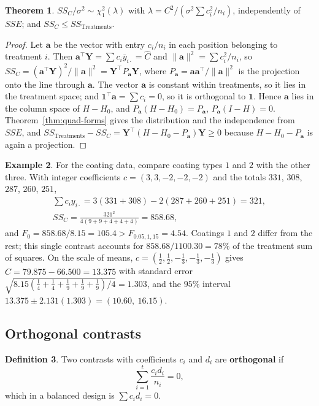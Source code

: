 \documentclass[11pt,a4paper]{article}
\numberwithin{equation}{section}
\theoremstyle{definition}
\newtheorem{thm}{Theorem}[subsection]
\newtheorem{defn}[thm]{Definition}
\newtheorem{exa}[thm]{Example}
\begin{document}
\begin{thm}\label{thm:contrast-ss}
$SS_C/\sigma^2 \sim \chi^2_1(\lambda)$ with $\lambda = C^2/(\sigma^2\sum c_i^2/n_i)$, independently of $SSE$; and $SS_C \le SS_{\mathrm{Treatments}}$.
\end{thm}

\begin{proof}
Let $\mathbf a$ be the vector with entry $c_i/n_i$ in each position belonging to treatment $i$. Then $\mathbf a^\top\mathbf Y = \sum c_i\bar y_{i\cdot} = \hat C$ and $\|\mathbf a\|^2 = \sum c_i^2/n_i$, so
$SS_C = (\mathbf a^\top\mathbf Y)^2/\|\mathbf a\|^2 = \mathbf Y^\top P_{\mathbf a}\mathbf Y$, where $P_{\mathbf a} = \mathbf a\mathbf a^\top/\|\mathbf a\|^2$ is the projection onto the line through $\mathbf a$. The vector $\mathbf a$ is constant
within treatments, so it lies in the treatment space; and $\mathbf 1^\top\mathbf a = \sum c_i = 0$, so it is orthogonal to $\mathbf 1$. Hence $\mathbf a$ lies in the column space of
$H - H_0$, and $P_{\mathbf a}(H - H_0) = P_{\mathbf a}$, $P_{\mathbf a}(I - H) = 0$. Theorem~\ref{thm:quad-forms} gives the distribution and the independence from $SSE$, and
$SS_{\mathrm{Treatments}} - SS_C = \mathbf Y^\top(H - H_0 - P_{\mathbf a})\mathbf Y \ge 0$ because $H - H_0 - P_{\mathbf a}$ is again a projection.
\end{proof}

\begin{exa}\label{exa:coating-contrast}
For the coating data, compare coating types $1$ and $2$ with the other three. With integer coefficients $c = (3, 3, -2, -2, -2)$ and the totals
$331$, $308$, $287$, $260$, $251$,
\begin{gather*}
\sum c_iy_{i\cdot} = 3(331 + 308) - 2(287 + 260 + 251) = 321 , \\
SS_C = \frac{321^2}{4(9 + 9 + 4 + 4 + 4)} = 858.68 ,
\end{gather*}
and $F_0 = 858.68/8.15 = 105.4 > F_{0.05,1,15} = 4.54$. Coatings $1$ and $2$ differ from the rest; this single contrast accounts for $858.68/1100.30 = 78\%$ of the
treatment sum of squares. On the scale of means, $c = (\frac12, \frac12, -\frac13, -\frac13, -\frac13)$ gives $\hat C = 79.875 - 66.500 = 13.375$ with standard error
$\sqrt{8.15(\frac14 + \frac14 + \frac19 + \frac19 + \frac19)/4} = 1.303$, and the $95\%$ interval $13.375 \pm 2.131(1.303) = (10.60,\ 16.15)$.
\end{exa}

\subsection{Orthogonal contrasts}
\begin{defn}
Two contrasts with coefficients $c_i$ and $d_i$ are \textbf{orthogonal} if
\[
\sum_{i=1}^t\frac{c_id_i}{n_i} = 0 ,
\]
which in a balanced design is $\sum c_id_i = 0$.
\end{defn}
\end{document}
